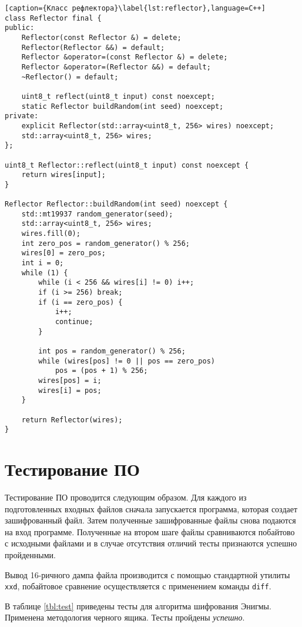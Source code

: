 \begin{lstlisting}[caption={Класс рефлектора}\label{lst:reflector},language=C++]
class Reflector final {
public:
    Reflector(const Reflector &) = delete;
    Reflector(Reflector &&) = default;
    Reflector &operator=(const Reflector &) = delete;
    Reflector &operator=(Reflector &&) = default;
    ~Reflector() = default;

    uint8_t reflect(uint8_t input) const noexcept;
    static Reflector buildRandom(int seed) noexcept;
private:
    explicit Reflector(std::array<uint8_t, 256> wires) noexcept;
    std::array<uint8_t, 256> wires;
};

uint8_t Reflector::reflect(uint8_t input) const noexcept {
    return wires[input];
}

Reflector Reflector::buildRandom(int seed) noexcept {
    std::mt19937 random_generator(seed);
    std::array<uint8_t, 256> wires;
    wires.fill(0);
    int zero_pos = random_generator() % 256;
    wires[0] = zero_pos;
    int i = 0;
    while (1) {
        while (i < 256 && wires[i] != 0) i++;
        if (i >= 256) break;
        if (i == zero_pos) {
            i++;
            continue;
        }

        int pos = random_generator() % 256;
        while (wires[pos] != 0 || pos == zero_pos)
            pos = (pos + 1) % 256;
        wires[pos] = i;
        wires[i] = pos;
    }
    
    return Reflector(wires);
}
\end{lstlisting}

\clearpage

\section{Тестирование ПО}

Тестирование ПО проводится следующим образом. Для каждого из подготовленных входных файлов сначала запускается программа, которая создает зашифрованный файл. Затем полученные зашифрованные файлы снова подаются на вход программе. Полученные на втором шаге файлы сравниваются побайтово с исходными файлами и в случае отсутствия отличий тесты признаются успешно пройденными.

Вывод 16-ричного дампа файла производится с помощью стандартной утилиты \texttt{xxd}, побайтовое сравнение осуществляется с применением команды \texttt{diff}.

В таблице \ref{tbl:test} приведены тесты для алгоритма шифрования Энигмы. 
Применена методология черного ящика. Тесты пройдены \textit{успешно}.

